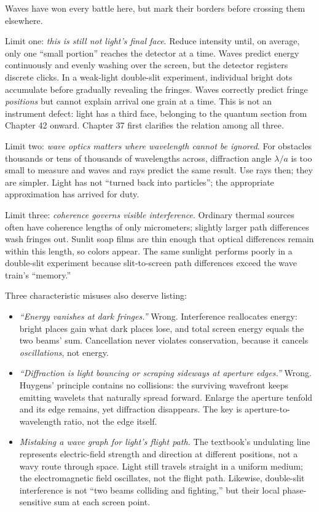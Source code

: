 \begin{mainline}
Waves have won every battle here, but mark their borders before crossing them elsewhere.

Limit one: \emph{this is still not light's final face}. Reduce intensity until, on average, only one ``small portion'' reaches the detector at a time. Waves predict energy continuously and evenly washing over the screen, but the detector registers discrete clicks. In a weak-light double-slit experiment, individual bright dots accumulate before gradually revealing the fringes. Waves correctly predict fringe \emph{positions} but cannot explain arrival one grain at a time. This is not an instrument defect: light has a third face, belonging to the quantum section from Chapter 42 onward. Chapter 37 first clarifies the relation among all three.

Limit two: \emph{wave optics matters where wavelength cannot be ignored}. For obstacles thousands or tens of thousands of wavelengths across, diffraction angle \(\lambda/a\) is too small to measure and waves and rays predict the same result. Use rays then; they are simpler. Light has not ``turned back into particles''; the appropriate approximation has arrived for duty.

Limit three: \emph{coherence governs visible interference}. Ordinary thermal sources often have coherence lengths of only micrometers; slightly larger path differences wash fringes out. Sunlit soap films are thin enough that optical differences remain within this length, so colors appear. The same sunlight performs poorly in a double-slit experiment because slit-to-screen path differences exceed the wave train's ``memory.''
\end{mainline}

Three characteristic misuses also deserve listing:

\begin{itemize}[leftmargin=1.8em]
  \item \emph{``Energy vanishes at dark fringes.''} Wrong. Interference reallocates energy: bright places gain what dark places lose, and total screen energy equals the two beams' sum. Cancellation never violates conservation, because it cancels \emph{oscillations}, not energy.
  \item \emph{``Diffraction is light bouncing or scraping sideways at aperture edges.''} Wrong. Huygens' principle contains no collisions: the surviving wavefront keeps emitting wavelets that naturally spread forward. Enlarge the aperture tenfold and its edge remains, yet diffraction disappears. The key is aperture-to-wavelength ratio, not the edge itself.
  \item \emph{Mistaking a wave graph for light's flight path.} The textbook's undulating line represents electric-field strength and direction at different positions, not a wavy route through space. Light still travels straight in a uniform medium; the electromagnetic field oscillates, not the flight path. Likewise, double-slit interference is not ``two beams colliding and fighting,'' but their local phase-sensitive sum at each screen point.
\end{itemize}

